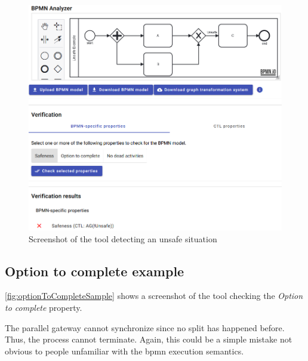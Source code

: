 \documentclass[runningheads]{llncs}
\begin{document}
\begin{figure}[ht]
    \centering
    \includegraphics[width=1\textwidth]{artifacts/unsafe_sample.png}
    \caption{Screenshot of the tool detecting an unsafe situation}
    \label{fig:unsafeSample}
\end{figure}

\subsection{Option to complete example}
\autoref{fig:optionToCompleteSample} shows a screenshot of the tool checking the \textit{Option to complete} property.

The parallel gateway cannot synchronize since no split has happened before.
Thus, the process cannot terminate.
Again, this could be a simple mistake not obvious to people unfamiliar with the \gls*{bpmn} execution semantics.
\end{document}
